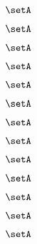 \begin{forslides}
\begin{forslides}
    \begin{equation}
        \label{eq:slides-translation-60}
        \setA
    \end{equation}

    \begin{equation}
        \label{eq:slides-translation-61}
        \setA
    \end{equation}

    \begin{equation}
        \label{eq:slides-translation-62}
        \setA
    \end{equation}

    \begin{equation}
        \label{eq:slides-translation-63}
        \setA
    \end{equation}

    \begin{equation}
        \label{eq:slides-translation-64}
        \setA
    \end{equation}

    \begin{equation}
        \label{eq:slides-translation-65}
        \setA
    \end{equation}

    \begin{equation}
        \label{eq:slides-translation-66}
        \setA
    \end{equation}

    \begin{equation}
        \label{eq:slides-translation-67}
        \setA
    \end{equation}

    \begin{equation}
        \label{eq:slides-translation-68}
        \setA
    \end{equation}

    \begin{equation}
        \label{eq:slides-translation-69}
        \setA
    \end{equation}

    \begin{equation}
        \label{eq:slides-translation-70}
        \setA
    \end{equation}

    \begin{equation}
        \label{eq:slides-translation-71}
        \setA
    \end{equation}

    \begin{equation}
        \label{eq:slides-translation-72}
        \setA
    \end{equation}


\end{forslides}
\end{forslides}
